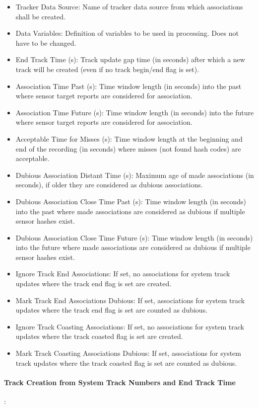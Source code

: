 \begin{itemize}  
\item Tracker Data Source: Name of tracker data source from which associations shall be created.
\item Data Variables: Definition of variables to be used in processing. Does not have to be changed.
\item End Track Time (s): Track update gap time (in seconds) after which a new track will be created (even if no track begin/end flag is set).
\item Association Time Past (s): Time window length (in seconds) into the past where sensor target reports are considered for association.
\item Association Time Future (s): Time window length (in seconds) into the future where sensor target reports are considered for association.
\item Acceptable Time for Misses (s): Time window length at the beginning and end of the recording (in seconds) where misses (not found hash codes) are acceptable.
\item Dubious Association Distant Time (s): Maximum age of made associations (in seconds), if older they are considered as dubious associations.
\item Dubious Association Close Time Past (s): Time window length (in seconds) into the past where made associations are considered as dubious if multiple sensor hashes exist.
\item Dubious Association Close Time Future (s): Time window length (in seconds) into the future where made associations are considered as dubious if multiple sensor hashes exist.
\item Ignore Track End Associations: If set, no associations for system track updates where the track end flag is set are created.
\item Mark Track End Associations Dubious: If set, associations for system track updates where the track end flag is set are counted as dubious.
\item Ignore Track Coasting Associations: If set, no associations for system track updates where the track coasted flag is set are created.
\item Mark Track Coasting Associations Dubious: If set, associations for system track updates where the track coasted flag is set are counted as dubious.
\end{itemize}

\paragraph{Track Creation from System Track Numbers and End Track Time}: 

